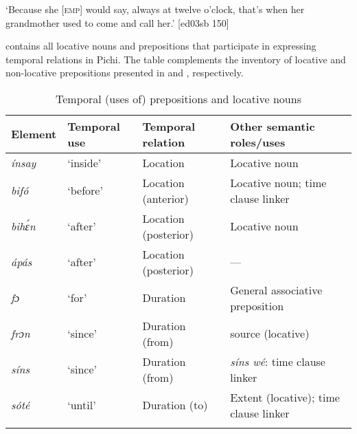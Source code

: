 \glt ‘Because she [\textsc{emp}] would say, always at twelve o’clock, that’s when her 
grandmother used to come and call her.’ [ed03sb 150]
\z

 contains all locative nouns and prepositions that participate in expressing temporal relations in Pichi. The table complements the inventory of locative and non-locative prepositions presented in  and , respectively.

\begin{table}
\caption{Temporal (uses of) prepositions and locative nouns}
\label{tab:key:8.7}

\begin{tabularx}{\textwidth}{lllQ}
\lsptoprule

Element & Temporal use & Temporal relation & Other semantic roles/uses\\
\midrule
\itshape ínsay & ‘inside’ & Location & Locative noun\\
\itshape bifó & ‘before’ & Location (anterior) & Locative noun; time clause linker\\
\itshape bihɛ́n & ‘after’ & Location (posterior) & Locative noun\\
\itshape ápás & ‘after’ & Location (posterior) & {}---\\
\itshape fɔ & ‘for’ & Duration & General associative preposition\\
\itshape frɔn & ‘since’ & Duration (from) & source (locative)\\
\itshape síns & ‘since’ & Duration (from) & \textit{síns wé}: time clause linker\\
\itshape sóté & ‘until’ & Duration (to) & Extent (locative); time clause linker\\
\lspbottomrule
\end{tabularx}
\end{table}
